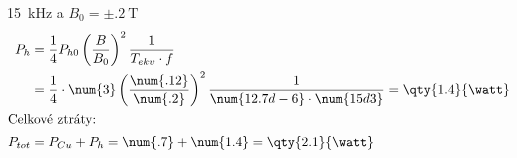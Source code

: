 \begin{example}
\begin{enumerate}[noitemsep]
          \qty{15}{\kilo\Hz}\) a \(B_0 = \pm\qty{.2}{\tesla}\)
          \begin{align*}
            P_{h}   &= \frac{1}{4}P_{h0}\left(\frac{B}{B_0}\right)^2\frac{1}{T_{ekv}\cdot f} \\
                    &= \frac{1}{4}\cdot\num{3}\left(\frac{\num{.12}}{\num{.2}}\right)^2
                       \frac{1}{\num{12.7d-6}\cdot\num{15d3}} = \qty{1.4}{\watt}              \\
            \shortintertext{Celkové ztráty:}
            P_{tot} &= P_{Cu} + P_{h} = \num{.7} + \num{1.4} = \qty{2.1}{\watt}
          \end{align*}
  \end{enumerate}
\end{example}
